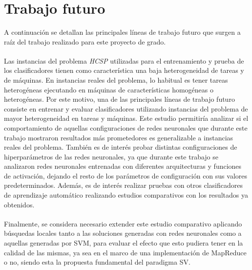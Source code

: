 \section{Trabajo futuro}

\paragraph{}A continuación se detallan las principales líneas de trabajo futuro que surgen a raíz del trabajo realizado para este proyecto de grado.

\paragraph{}Las instancias del problema \textit{HCSP} utilizadas para el entrenamiento y prueba de los clasificadores tienen como característica una baja heterogeneidad de tareas y de máquinas. En instancias reales del problema, lo habitual es tener tareas heterogéneas ejecutando en máquinas de características homogéneas o heterogéneas.
Por este motivo, una de las principales líneas de trabajo futuro consiste en entrenar y evaluar clasificadores utilizando instancias del problema de mayor heterogeneidad en tareas y máquinas.
Este estudio permitiría analizar si el comportamiento de aquellas configuraciones de redes neuronales que durante este trabajo mostraron resultados más prometedores es generalizable a instancias reales del problema.
También es de interés probar distintas configuraciones de hiperparámetros de las redes neuronales, ya que durante este trabajo se analizaron redes neuronales entrenadas con diferentes arquitecturas y funciones de activación, dejando el resto de los parámetros de configuración con sus valores predeterminados. Además, es de interés realizar pruebas con otros clasificadores de aprendizaje automático realizando estudios comparativos con los resultados ya obtenidos.

\paragraph{}Finalmente, se considera necesario extender este estudio comparativo aplicando búsquedas locales tanto a las soluciones generadas con redes neuronales como a aquellas generadas por SVM, para evaluar el efecto que esto pudiera tener en la calidad de las mismas, ya sea en el marco de una implementación de MapReduce o no, siendo esta la propuesta fundamental del paradigma SV.

